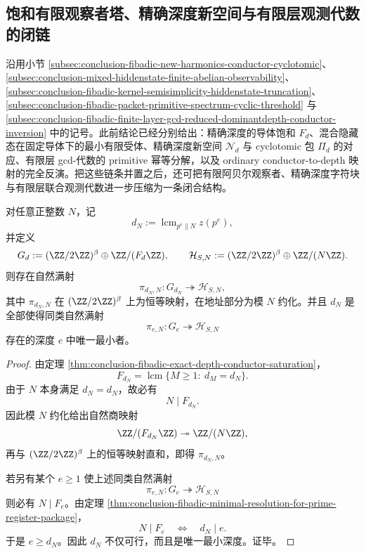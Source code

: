 \subsection{饱和有限观察者塔、精确深度新空间与有限层观测代数的闭链}\label{subsec:conclusion-fibadic-saturated-observer-tower-depth-algebra-closure}
沿用小节 \ref{subsec:conclusion-fibadic-new-harmonics-conductor-cyclotomic}、
\ref{subsec:conclusion-mixed-hiddenstate-finite-abelian-observability}、
\ref{subsec:conclusion-fibadic-kernel-semisimplicity-hiddenstate-truncation}、
\ref{subsec:conclusion-fibadic-packet-primitive-spectrum-cyclic-threshold}
与
\ref{subsec:conclusion-fibadic-finite-layer-gcd-reduced-dominantdepth-conductor-inversion}
中的记号。此前结论已经分别给出：精确深度的导体饱和 \(F_d\)、混合隐藏态在固定导体下的最小有限受体、精确深度新空间 \(\mathcal N_d\) 与 cyclotomic 包 \(\Pi_d\) 的对应、有限层 gcd-代数的 primitive 幂等分解，以及 ordinary conductor-to-depth 映射的完全反演。把这些链条并置之后，还可把有限阿贝尔观察者、精确深度字符块与有限层联合观测代数进一步压缩为一条闭合结构。

\begin{proposition}[精确深度饱和层的共终端性]\label{prop:conclusion-fibadic-saturated-observer-cofinality}
对任意正整数 \(N\)，记
\[
d_N:=\operatorname{lcm}_{p^e\parallel N} z(p^e),
\]
并定义
\[
G_d:=(\ZZ/2\ZZ)^\beta\oplus \ZZ/(F_d\ZZ),
\qquad
\mathcal H_{S,N}:=(\ZZ/2\ZZ)^\beta\oplus \ZZ/(N\ZZ).
\]
则存在自然满射
\[
\pi_{d_N,N}:G_{d_N}\twoheadrightarrow \mathcal H_{S,N},
\]
其中 \(\pi_{d_N,N}\) 在 \((\ZZ/2\ZZ)^\beta\) 上为恒等映射，在地址部分为模 \(N\) 约化。并且 \(d_N\) 是全部使得同类自然满射
\[
\pi_{e,N}:G_e\twoheadrightarrow \mathcal H_{S,N}
\]
存在的深度 \(e\) 中唯一最小者。
\end{proposition}
\begin{proof}
由定理 \ref{thm:conclusion-fibadic-exact-depth-conductor-saturation}，
\[
F_{d_N}
=
\operatorname{lcm}\{M\ge 1:\ d_M=d_N\}.
\]
由于 \(N\) 本身满足 \(d_N=d_N\)，故必有
\[
N\mid F_{d_N}.
\]
因此模 \(N\) 约化给出自然商映射
\[
\ZZ/(F_{d_N}\ZZ)\twoheadrightarrow \ZZ/(N\ZZ),
\]
再与 \((\ZZ/2\ZZ)^\beta\) 上的恒等映射直和，即得 \(\pi_{d_N,N}\)。

若另有某个 \(e\ge 1\) 使上述同类自然满射
\[
\pi_{e,N}:G_e\twoheadrightarrow \mathcal H_{S,N}
\]
则必有 \(N\mid F_e\)。由定理
\ref{thm:conclusion-fibadic-minimal-resolution-for-prime-register-package}，
\[
N\mid F_e
\quad\Longleftrightarrow\quad
d_N\mid e.
\]
于是 \(e\ge d_N\)。因此 \(d_N\) 不仅可行，而且是唯一最小深度。证毕。
\end{proof}


